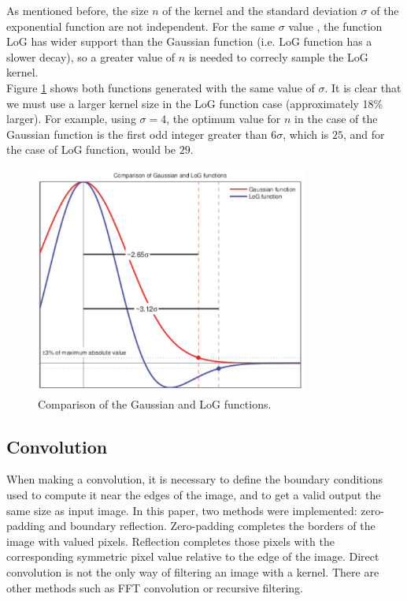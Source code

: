 \documentclass{ipol}
\numberwithin{equation}{section}
\numberwithin{table}{section}
\begin{document}
{As mentioned before, the size $n$ of the kernel and the standard deviation $\sigma$ of the exponential function 
are not independent. For the same $\sigma$ value , the function LoG has wider support than the
Gaussian function (i.e. LoG function has a slower decay), so a greater value of $n$ is needed to correcly sample the LoG kernel.\\

Figure \ref{fig:kernels} shows both functions generated with the same value of $\sigma$. It is clear that we must use a larger kernel size in the LoG function case (approximately 18\% larger). For 
example, using $\sigma=4$, the optimum value for $n$ in the case of the Gaussian function is the 
first odd integer greater than $6\sigma$, which is $25$, and for the case of LoG function, would 
be $29$.

\begin{figure}
	\centering
	\includegraphics[width=0.8\textwidth]{kernels.pdf}
	\caption{Comparison of the Gaussian and LoG functions.}
	\label{fig:kernels}
\end{figure}


\subsection{Convolution}

When making a convolution, it is necessary to define the boundary conditions used to compute it near the edges of the image, and to get a valid output the same size as input image. In this paper, 
two methods were implemented: zero-padding and boundary reflection. Zero-padding completes the borders of the image with valued pixels. Reflection completes those pixels with the corresponding symmetric pixel value  relative to the edge of the image. Direct convolution is not the only way of filtering an image with a kernel. There are other methods such as FFT convolution or recursive filtering.%

}
\end{document}
